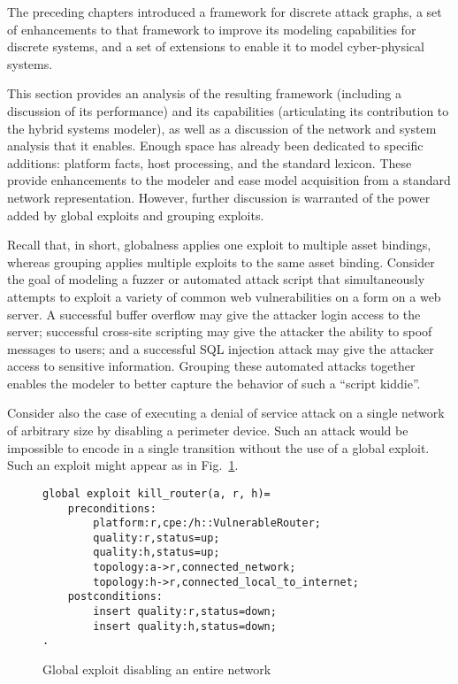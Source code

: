 The preceding chapters introduced a framework for discrete attack graphs,
a set of enhancements to that framework to improve its modeling capabilities for
discrete systems, and a set of extensions to enable it to model cyber-physical
systems.

This section provides an analysis of the resulting framework (including
a discussion of its performance) and its capabilities (articulating its
contribution to the hybrid systems modeler), as well as a discussion of the
network and system analysis that it enables.
Enough space has already been dedicated to specific additions: platform
facts, host processing, and the standard lexicon. These provide enhancements
to the modeler and ease model acquisition from a standard network 
representation. However, further discussion is warranted of the power added
by global exploits and grouping exploits.

Recall that, in short, globalness applies one exploit to multiple asset 
bindings, whereas grouping applies multiple exploits to the same asset binding.
Consider the goal of modeling a fuzzer or automated attack script that
simultaneously attempts to exploit a variety of common web vulnerabilities on
a form on a web server. A successful buffer overflow may give the attacker
login access to the server; successful cross-site scripting may give the
attacker the ability to spoof messages to users; and a successful SQL injection
attack may give the attacker access to sensitive information. Grouping these
automated attacks together enables the modeler to better capture the behavior
of such a ``script kiddie''.

Consider also the case of executing a denial of service attack on a single
network of arbitrary size by disabling a perimeter device. Such an attack would
be impossible to encode in a single transition without the use of a global
exploit. Such an exploit might appear as in Fig.~\ref{fig:network_dos_global}.

\begin{figure}
\begin{lstlisting}
global exploit kill_router(a, r, h)=
    preconditions:
        platform:r,cpe:/h::VulnerableRouter;
        quality:r,status=up;
        quality:h,status=up;
        topology:a->r,connected_network;
        topology:h->r,connected_local_to_internet;
    postconditions:
        insert quality:r,status=down;
        insert quality:h,status=down;
.
\end{lstlisting}
\caption{Global exploit disabling an entire network}
\label{fig:network_dos_global}
\end{figure}

